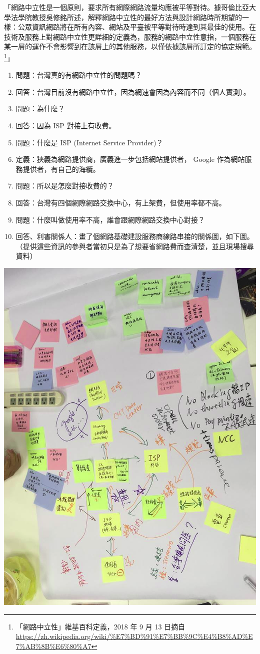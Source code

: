 \documentclass[12pt,a4paper]{article}
\begin{document}
\begin{enumerate}
\begin{enumerate}
「網路中立性是一個原則，要求所有網際網路流量均應被平等對待。據哥倫比亞大學法學院教授吳修銘所述，解釋網路中立性的最好方法與設計網路時所期望的一樣：公眾資訊網路將在所有內容、網站及平臺被平等對待時達到其最佳的使用。在技術及服務上對網路中立性更詳細的定義為，服務的網路中立性意指，一個服務在某一層的運作不會影響到在該層上的其他服務，以僅依據該層所訂定的協定規範。\footnote{「網路中立性」維基百科定義，2018 年 9 月 13 日摘自 \url{https://zh.wikipedia.org/wiki/\%E7\%BD\%91\%E7\%BB\%9C\%E4\%B8\%AD\%E7\%AB\%8B\%E6\%80\%A7}}」

\begin{enumerate}
\item 問題：台灣真的有網路中立性的問題嗎？
\item 回答：台灣目前沒有網路中立性，因為網速會因為內容而不同（個人實測）。
\item 問題：為什麼？
\item 回答：因為 ISP 對接上有收費。
\item 問題：什麼是 ISP (Internet Service Provider)？
\item 定義：狹義為網路提供商，廣義進一步包括網站提供者， Google 作為網站服務提供者，有自己的海纜。
\item 問題：所以是怎麼對接收費的？
\item 回答：台灣有四個網際網路交換中心，有上架費，但使用率都不高。
\item 問題：什麼叫做使用率不高，誰會跟網際網路交換中心對接？
\item 回答、利害關係人：畫了個網路基礎建設服務商線路串接的關係圖，如下圖。（提供這些資訊的參與者當初只是為了想要省網路費而查清楚，並且現場搜尋資料）
\end{enumerate}
\begin{center}
\includegraphics[width=.9\linewidth]{./images/net-neutrality-ISP.png}

\end{center}
\end{enumerate}
\end{enumerate}
\end{document}

